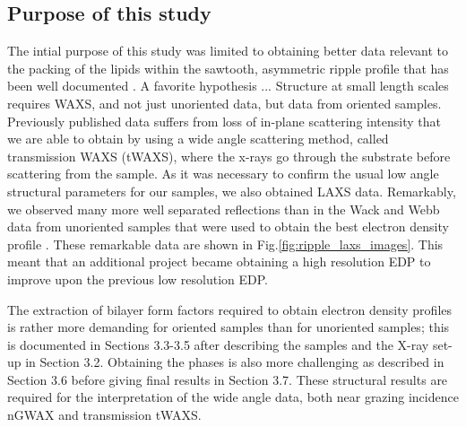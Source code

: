\subsection{Purpose of this study}
The intial purpose of this study was limited to obtaining better data relevant
to the packing of the lipids within the sawtooth, asymmetric ripple profile 
that has been well documented \cite{ref:Sun96}. A favorite hypothesis  ... 
Structure at small length scales requires WAXS, and not just unoriented data, 
but data from oriented samples.  Previously published data suffers from loss 
of in-plane scattering intensity that we are able to obtain by using a wide 
angle scattering method, called  transmission WAXS (tWAXS), where the x-rays 
go through the substrate before scattering from the sample.  As it was 
necessary to confirm the usual low angle structural parameters for our 
samples, we also obtained LAXS data.  Remarkably, we observed many more well 
separated reflections than in the Wack and Webb data  from unoriented samples 
that were used to obtain the best electron density profile \cite{ref:Sun96}.  
These remarkable data are shown in Fig.\ref{fig:ripple_laxs_images}.  
This meant that an additional project became obtaining a high resolution EDP 
to improve upon the previous low resolution EDP.

The extraction of bilayer form factors required to obtain electron density 
profiles is rather more demanding for oriented samples than for unoriented 
samples; this is documented in Sections 3.3-3.5 after describing the samples 
and the X-ray set-up in Section 3.2.  Obtaining the phases is also more 
challenging as described in Section 3.6 before giving final results in 
Section 3.7.  These structural results are required for the interpretation 
of the wide angle data, both near grazing incidence nGWAX and transmission 
tWAXS.  

